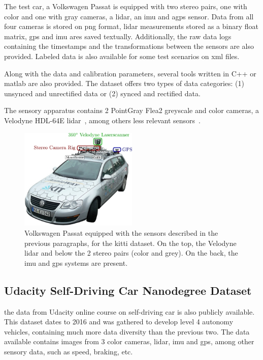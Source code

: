 The test car, a Volkswagen Passat is equipped with two stereo pairs, one with color and one with gray cameras, a \ac{lidar}, an \ac{imu} and a\ac{gps} sensor. Data from all four cameras is stored on \ac{png} format, \ac{lidar} measurements stored as a binary float matrix, \ac{gps} and {imu} ares saved textually. Additionally, the raw data logs containing the timestamps and the transformations between the sensors are also provided. Labeled data is also available for some test scenarios on \ac{xml} files.

Along with the data and calibration parameters, several tools written in C++ or \ac{matlab} are also provided. The dataset offers two types of data categories: (1) unsynced and unrectified data or (2) synced and rectified data. 

The sensory apparatus contains 2 PointGray Flea2 greyscale and color cameras, a Velodyne HDL-64E \ac{lidar}~\cite{VelodyneHDL64}, among others less relevant sensors~\cite{Geiger2013a}.

\begin{figure}
	\centering
	\includegraphics[width=0.5\textwidth]{img/sensor_fusion/passat_sensors.jpg}
	\caption{Volkswagen Passat equipped with the sensors described in the previous paragraphs, for the \ac{kitti} dataset. On the top, the Velodyne \ac{lidar} and below the 2 stereo pairs (color and grey). On the back, the \ac{imu} and {gps} systems are present.}
	\label{fig:sota:kitti_sensors}
\end{figure}


\subsection{Udacity Self-Driving Car Nanodegree Dataset}
the data from Udacity online course on self-driving car is also publicly available. This dataset dates to 2016 and was gathered to develop level 4 autonomy vehicles, containing much more data diversity than the previous two. The data available contains images from 3 color cameras,  \ac{lidar}, \ac{imu} and \ac{gps}, among other sensory data, such as speed, braking, etc.

